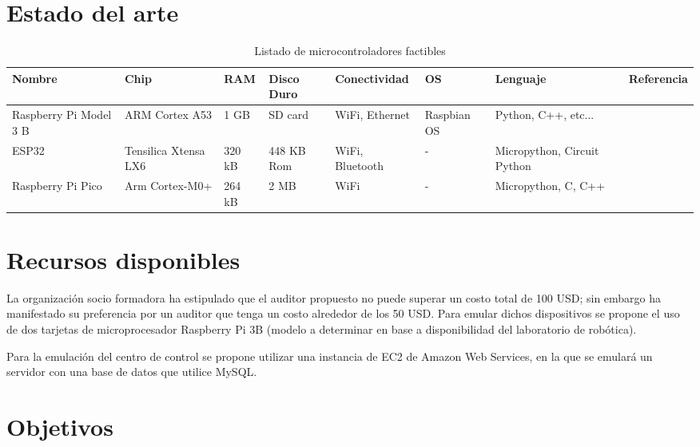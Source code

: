 \documentclass{article}
\begin{document}
    \section{Estado del arte}

        \begin{table}[htbp]
            \centering
            \begin{tabularx}{\textwidth}{ |X|X|l|X|X|X|X|X| }
                \hline
                Nombre & Chip & RAM & Disco Duro & Conectividad & OS & Lenguaje & Referencia \\
                \hline
                Raspberry Pi Model 3 B & ARM Cortex A53 & 1 GB & SD card & WiFi, Ethernet  & Raspbian OS & Python, C++, etc...  & \cite{el2018analysis}   \\
                \hline
                ESP32 & Tensilica Xtensa LX6 & 320 kB & 448 KB Rom & WiFi, Bluetooth & - & Micropython, Circuit Python & \cite{anand2019secure} \\
                \hline
                Raspberry Pi Pico & Arm Cortex-M0+ & 264 kB & 2 MB & WiFi & - & Micropython, C, C++ & \cite{pico_specs} \\
                \hline
            \end{tabularx}
            \label{tab:controllers}
            \caption{Listado de microcontroladores factibles}
        \end{table}


    \section{Recursos disponibles}

        La organización socio formadora ha estipulado que el auditor propuesto no puede superar un costo total de 100 USD; sin embargo ha manifestado su preferencia por un auditor que tenga un costo alrededor de los 50 USD. Para emular dichos dispositivos se propone el uso de dos tarjetas de microprocesador Raspberry Pi 3B
        (modelo a determinar en base a disponibilidad del laboratorio de robótica).

        Para la emulación del centro de control se propone utilizar una instancia de EC2 de Amazon Web Services, en la que se emulará un servidor con una base de datos que utilice MySQL.

    \section{Objetivos}
\end{document}
